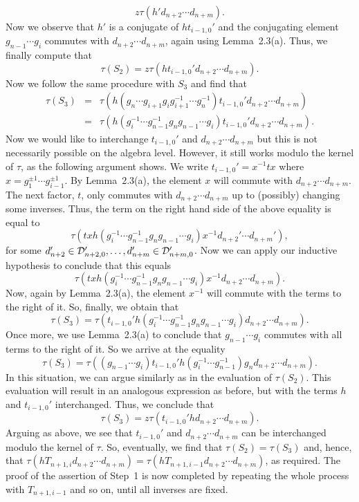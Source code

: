 \begin{pf}
\[z\tau(h'd_{n+2} \cdots d_{n+m}).\]
Now we observe that $h'$ is a conjugate of $ht_{i-1,0}'$ and the conjugating
element $g_{n-1} \cdots g_i$ commutes with $d_{n+2} \cdots d_{n+m}$, again
using Lemma~2.3(a). Thus, we finally compute that
\[\tau(S_2) = z \tau(ht_{i-1,0}'d_{n+2} \cdots d_{n+m}).\]
Now we follow the same procedure with $S_3$ and find that
\begin{eqnarray*}
\tau(S_3) & = & \tau(h (g_n \cdots g_{i+1}g_ig_{i+1}^{-1} \cdots g_n^{-1})
                                    t_{i-1,0}'d_{n+2} \cdots d_{n+m}) \\
    & = & \tau(h (g_i^{-1}  \cdots g_{n-1}^{-1}g_ng_{n-1} 
                            \cdots g_i)t_{i-1,0}'d_{n+2} \cdots d_{n+m}).
\end{eqnarray*}
Now we  would like  to  interchange $t_{i-1,0}'$  and $d_{n+2}  \cdots
d_{n+m}$ but  this   is   not  necessarily possible   on   the algebra
level.  However, it still works  modulo the kernel  of  $\tau$, as the
following   argument shows.   We  write  $t_{i-1,0}'=x^{-1}tx$   where
$x=g_1^{\pm 1} \cdots g_{i-1}^{\pm  1}$.  By Lemma~2.3(a), the element
$x$ will commute with $d_{n+2} \cdots d_{n+m}$.  The next factor, $t$,
only commutes with $d_{n+2}  \cdots d_{n+m}$ up to (possibly) changing
some  inverses. Thus, the  term  on the right   hand side of the above
equality is equal to
\[ \tau(tx h (g_i^{-1} \cdots g_{n-1}^{-1}g_ng_{n-1} 
                         \cdots g_i)x^{-1}d_{n+2}' \cdots d_{n+m}'),\]
for some $d_{n+2}' \in {\cal D}_{n+2,0}',\ldots, d_{n+m}' 
\in {\cal D}_{n+m,0}'$. Now we can apply our inductive hypothesis to 
conclude that this equals
\[ \tau(tx h (g_i^{-1} \cdots g_{n-1}^{-1}g_ng_{n-1} 
                         \cdots g_i)x^{-1}d_{n+2} \cdots d_{n+m}).\]
Now, again by Lemma~2.3(a), the element $x^{-1}$ will commute with the
terms to the right of it. So, finally, we obtain that
\[ \tau(S_3) = \tau(t_{i-1,0}'h (g_i^{-1} \cdots g_{n-1}^{-1}g_ng_{n-1} 
                         \cdots g_i)d_{n+2} \cdots d_{n+m}).\]
Once more, we use Lemma~2.3(a) to conclude that $g_{n-1} \cdots g_i$ 
commutes with all terms to the right of it. So we arrive at the equality
\[ \tau(S_3)=\tau((g_{n-1} \cdots g_i)t_{i-1,0}'h 
(g_i^{-1} \cdots g_{n-1}^{-1}) g_nd_{n+2} \cdots d_{n+m}).\]
In this situation, we can argue similarly as in the evaluation
of $\tau(S_2)$. This evaluation will result in  an analogous expression as 
before, but with the terms $h$ and $t_{i-1,0}'$ interchanged. Thus, we
conclude that
\[\tau(S_3)=z\tau(t_{i-1,0}'hd_{n+2} \cdots d_{n+m}).\] Arguing as above,
we see that $t_{i-1,0}'$ and $d_{n+2} \cdots d_{n+m}$ can be 
interchanged modulo the kernel of $\tau$.  So, eventually, we find that
$\tau(S_2)=\tau(S_3)$ and, hence, that $\tau(hT_{n+1,i}d_{n+2} \cdots
d_{n+m})=\tau(hT_{n+1,i-1}d_{n+2} \cdots d_{n+m})$, as required. The proof 
of the assertion of Step~1 is now completed by repeating the whole process 
with $T_{n+1,i-1}$ and so on, until all inverses are fixed.


\end{pf}
